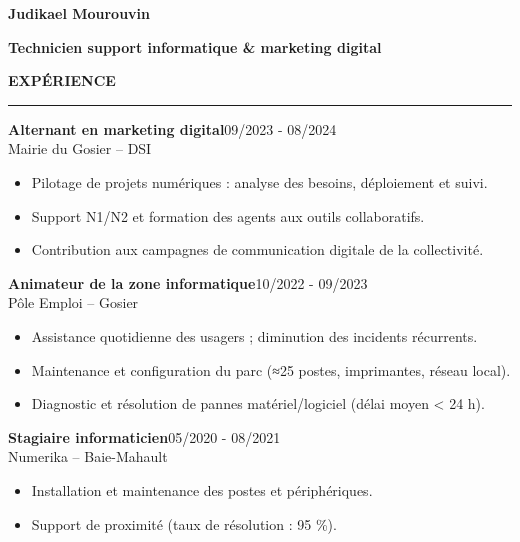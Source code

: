 \documentclass{article}
\newcommand{\cvsection}[1]{%
  \par\bigskip
  {\bfseries\Large #1}\par
  \noindent\rule{\linewidth}{0.8pt}\par\medskip}
\begin{document}
\pagestyle{empty}
\begin{paracol}{2}

{\LARGE\textbf{Judikael Mourouvin}}

\bigskip
{\large\textbf{Technicien support informatique \& marketing digital}}

\vspace{0.8cm}

\cvsection{EXPÉRIENCE}
\colorbox{maincolor}{%
  \begin{minipage}{\linewidth}
    \noindent
    \textbf{Alternant en marketing digital}\hfill 09/2023 - 08/2024\\
    Mairie du Gosier – DSI\\[-0.3em]
    \begin{itemize}[leftmargin=*]
      \item Pilotage de projets numériques : analyse des besoins, déploiement et suivi. \item Support N1/N2 et formation des agents aux outils collaboratifs. \item Contribution aux campagnes de communication digitale de la collectivité.
    \end{itemize}
  \end{minipage}}

\vspace{3mm}

\colorbox{maincolor}{%
  \begin{minipage}{\linewidth}
    \noindent
    \textbf{Animateur de la zone informatique}\hfill 10/2022 - 09/2023\\
    Pôle Emploi – Gosier\\[-0.3em]
    \begin{itemize}[leftmargin=*]
      \item Assistance quotidienne des usagers ; diminution des incidents récurrents. \item Maintenance et configuration du parc (≈25 postes, imprimantes, réseau local). \item Diagnostic et résolution de pannes matériel/logiciel (délai moyen < 24 h).
    \end{itemize}
  \end{minipage}}

\vspace{3mm}

\colorbox{maincolor}{%
  \begin{minipage}{\linewidth}
    \noindent
    \textbf{Stagiaire informaticien}\hfill 05/2020 - 08/2021\\
    Numerika – Baie-Mahault\\[-0.3em]
    \begin{itemize}[leftmargin=*]
      \item Installation et maintenance des postes et périphériques. \item Support de proximité (taux de résolution : 95 \%).
    \end{itemize}
  \end{minipage}}


\end{paracol}
\end{document}
